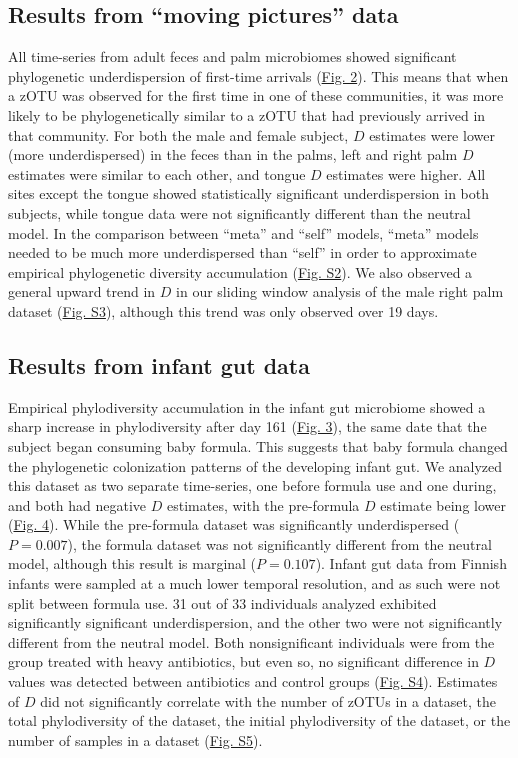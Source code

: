 \documentclass{article}
\begin{document}
\subsection{Results from “moving pictures” data}
All time-series from adult feces and palm microbiomes \cite{Caporaso2011} showed significant phylogenetic underdispersion of first-time arrivals (\hyperref[sec:figure2]{Fig. 2}). This means that when a zOTU was observed for the first time in one of these communities, it was more likely to be phylogenetically similar to a zOTU that had previously arrived in that community. For both the male and female subject, \(D\) estimates were lower (more underdispersed) in the feces than in the palms, left and right palm \(D\) estimates were similar to each other, and tongue \(D\) estimates were higher. All sites except the tongue showed statistically significant underdispersion in both subjects, while tongue data were not significantly different than the neutral model. In the comparison between “meta” and “self” models, “meta” models needed to be much more underdispersed than “self” in order to approximate empirical phylogenetic diversity accumulation (\hyperref[sec:figureS2]{Fig. S2}). We also observed a general upward trend in \(D\) in our sliding window analysis of the male right palm dataset (\hyperref[sec:figureS3]{Fig. S3}), although this trend was only observed over 19 days.

\subsection{Results from infant gut data}
Empirical phylodiversity accumulation in the infant gut microbiome \cite{Koenig2011} showed a sharp increase in phylodiversity after day 161 (\hyperref[sec:figure3]{Fig. 3}), the same date that the subject began consuming baby formula. This suggests that baby formula changed the phylogenetic colonization patterns of the developing infant gut. We analyzed this dataset as two separate time-series, one before formula use and one during, and both had negative \(D\) estimates, with the pre-formula \(D\) estimate being lower (\hyperref[sec:figure4]{Fig. 4}). While the pre-formula dataset was significantly underdispersed (\(P = 0.007\)), the formula dataset was not significantly different from the neutral model, although this result is marginal (\(P = 0.107\)). Infant gut data from Finnish infants \cite{Yassour2016} were sampled at a much lower temporal resolution, and as such were not split between formula use. 31 out of 33 individuals analyzed exhibited significantly significant underdispersion, and the other two were not significantly different from the neutral model. Both nonsignificant individuals were from the group treated with heavy antibiotics, but even so, no significant difference in \(D\) values was detected between antibiotics and control groups (\hyperref[sec:figureS4]{Fig. S4}). Estimates of \(D\) did not significantly correlate with the number of zOTUs in a dataset, the total phylodiversity of the dataset, the initial phylodiversity of the dataset, or the number of samples in a dataset (\hyperref[sec:figureS5]{Fig. S5}). 
\end{document}
